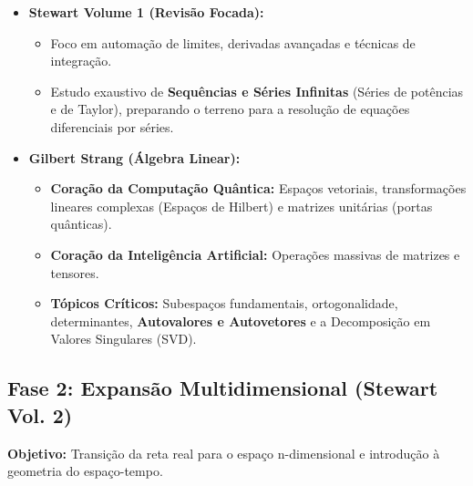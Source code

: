 \documentclass[11pt,a4paper]{article}
\begin{document}
\begin{itemize}[leftmargin=1.5cm]
    \item[\textbf{1.1}] \textbf{Stewart Volume 1 (Revisão Focada):} 
    \begin{itemize}
        \item Foco em automação de limites, derivadas avançadas e técnicas de integração.
        \item Estudo exaustivo de \textbf{Sequências e Séries Infinitas} (Séries de potências e de Taylor), preparando o terreno para a resolução de equações diferenciais por séries.
    \end{itemize}
    
    \item[\textbf{1.2}] \textbf{Gilbert Strang (Álgebra Linear):}
    \begin{itemize}
        \item \textbf{Coração da Computação Quântica:} Espaços vetoriais, transformações lineares complexas (Espaços de Hilbert) e matrizes unitárias (portas quânticas).
        \item \textbf{Coração da Inteligência Artificial:} Operações massivas de matrizes e tensores.
        \item \textbf{Tópicos Críticos:} Subespaços fundamentais, ortogonalidade, determinantes, \textbf{Autovalores e Autovetores} e a Decomposição em Valores Singulares (SVD).
    \end{itemize}
\end{itemize}

\subsection{Fase 2: Expansão Multidimensional (Stewart Vol. 2)}
\textbf{Objetivo:} Transição da reta real para o espaço n-dimensional e introdução à geometria do espaço-tempo.
\end{document}

